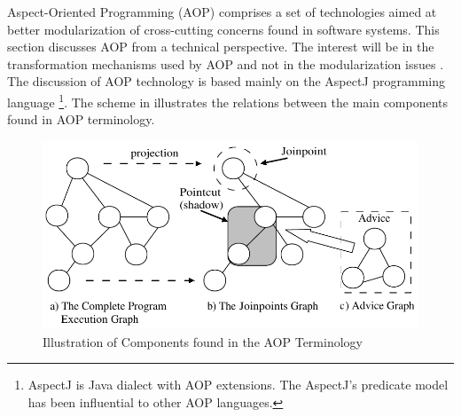 Aspect-Oriented Programming (AOP) \cite{kiczalesetal.97} comprises a set of technologies aimed at better modularization of cross-cutting concerns found in software systems. This section discusses AOP from a technical perspective. The interest will be in the transformation mechanisms used by AOP and not in the modularization issues \cite{Crosscutting2.03}. %
The discussion of AOP technology is based mainly on the AspectJ programming language \cite{Laddad.aop, www.aspectjt}\footnote{AspectJ is Java dialect with AOP extensions. The AspectJ's predicate model has been influential to other AOP languages.}. The scheme in  illustrates the relations between the main components found in AOP terminology.

\begin{figure}[ht]
	\begin{center}
		\includegraphics[width=12cm,height=!]{ch02/aop}
	\end{center}
	\caption{Illustration of Components found in the AOP Terminology}
	\label{fig:ch2aop}
\end{figure}

